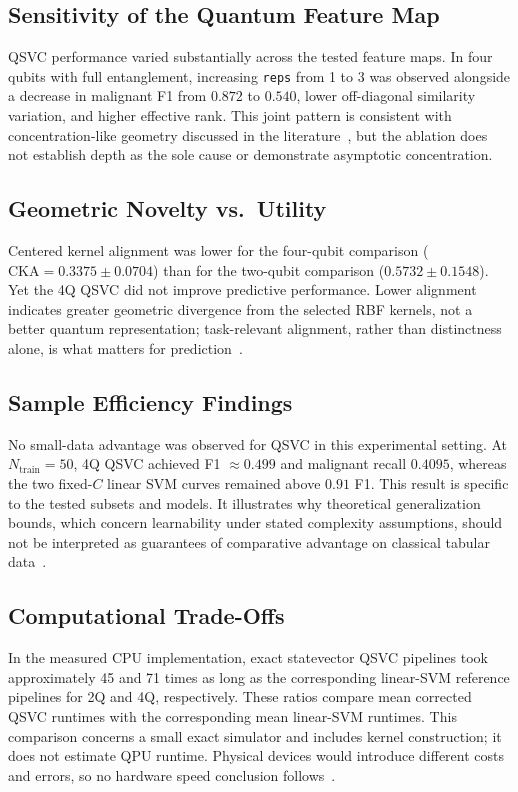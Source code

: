 \documentclass[12pt,a4paper]{article}
\begin{document}
\subsection{Sensitivity of the Quantum Feature Map}
QSVC performance varied substantially across the tested feature maps. In four qubits with full entanglement, increasing \texttt{reps} from 1 to 3 was observed alongside a decrease in malignant F1 from $0.872$ to $0.540$, lower off-diagonal similarity variation, and higher effective rank. This joint pattern is consistent with concentration-like geometry discussed in the literature~\cite{thanasilp2024exponential}, but the ablation does not establish depth as the sole cause or demonstrate asymptotic concentration.

\subsection{Geometric Novelty vs.\ Utility}
Centered kernel alignment was lower for the four-qubit comparison ($\text{CKA} = 0.3375 \pm 0.0704$) than for the two-qubit comparison ($0.5732 \pm 0.1548$). Yet the 4Q QSVC did not improve predictive performance. Lower alignment indicates greater geometric divergence from the selected RBF kernels, not a better quantum representation; task-relevant alignment, rather than distinctness alone, is what matters for prediction~\cite{huang2021power, kubler2021inductive}.

\subsection{Sample Efficiency Findings}
No small-data advantage was observed for QSVC in this experimental setting. At $N_{\text{train}}=50$, 4Q QSVC achieved F1 $\approx 0.499$ and malignant recall $0.4095$, whereas the two fixed-$C$ linear SVM curves remained above $0.91$ F1. This result is specific to the tested subsets and models. It illustrates why theoretical generalization bounds, which concern learnability under stated complexity assumptions, should not be interpreted as guarantees of comparative advantage on classical tabular data~\cite{caro2022generalization}.

\subsection{Computational Trade-Offs}
In the measured CPU implementation, exact statevector QSVC pipelines took approximately 45 and 71 times as long as the corresponding linear-SVM reference pipelines for 2Q and 4Q, respectively. These ratios compare mean corrected QSVC runtimes with the corresponding mean linear-SVM runtimes. This comparison concerns a small exact simulator and includes kernel construction; it does not estimate QPU runtime. Physical devices would introduce different costs and errors, so no hardware speed conclusion follows~\cite{preskill2018quantum, aaronson2015read}.
\end{document}
